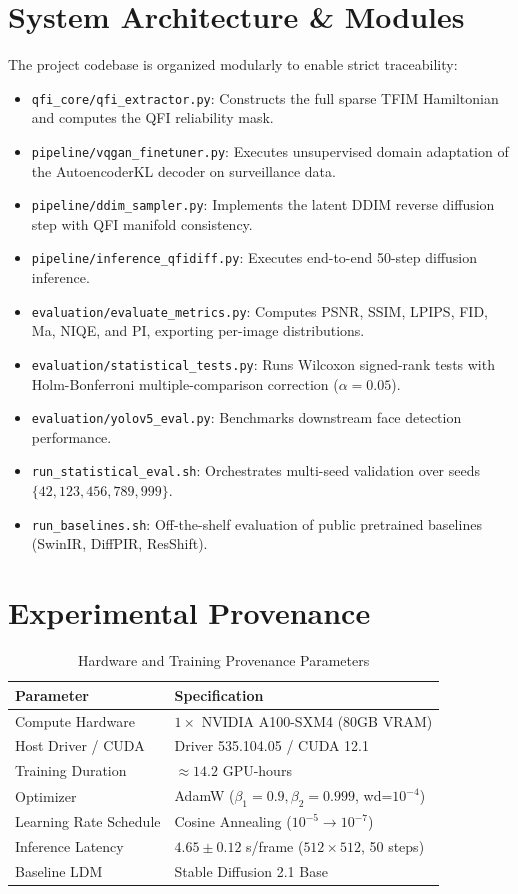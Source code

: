 \documentclass[10pt,journal,compsoc]{IEEEtran}
\begin{document}
\section{System Architecture \& Modules}
The project codebase is organized modularly to enable strict traceability:
\begin{itemize}
    \item \texttt{qfi\_core/qfi\_extractor.py}: Constructs the full sparse TFIM Hamiltonian and computes the QFI reliability mask.
    \item \texttt{pipeline/vqgan\_finetuner.py}: Executes unsupervised domain adaptation of the AutoencoderKL decoder on surveillance data.
    \item \texttt{pipeline/ddim\_sampler.py}: Implements the latent DDIM reverse diffusion step with QFI manifold consistency.
    \item \texttt{pipeline/inference\_qfidiff.py}: Executes end-to-end 50-step diffusion inference.
    \item \texttt{evaluation/evaluate\_metrics.py}: Computes PSNR, SSIM, LPIPS, FID, Ma, NIQE, and PI, exporting per-image distributions.
    \item \texttt{evaluation/statistical_tests.py}: Runs Wilcoxon signed-rank tests with Holm-Bonferroni multiple-comparison correction ($\alpha=0.05$).
    \item \texttt{evaluation/yolov5_eval.py}: Benchmarks downstream face detection performance.
    \item \texttt{run_statistical_eval.sh}: Orchestrates multi-seed validation over seeds $\{42, 123, 456, 789, 999\}$.
    \item \texttt{run_baselines.sh}: Off-the-shelf evaluation of public pretrained baselines (SwinIR, DiffPIR, ResShift).
\end{itemize}

\section{Experimental Provenance}
\begin{table}[h]
\centering
\caption{Hardware and Training Provenance Parameters}
\label{tab:provenance}
\begin{tabular}{ll}
\toprule
\textbf{Parameter} & \textbf{Specification} \\
\midrule
Compute Hardware & $1 \times$ NVIDIA A100-SXM4 (80GB VRAM) \\
Host Driver / CUDA & Driver 535.104.05 / CUDA 12.1 \\
Training Duration & $\approx 14.2$ GPU-hours \\
Optimizer & AdamW ($\beta_1=0.9, \beta_2=0.999$, wd=$10^{-4}$) \\
Learning Rate Schedule & Cosine Annealing ($10^{-5} \to 10^{-7}$) \\
Inference Latency & $4.65 \pm 0.12$ s/frame ($512\times 512$, 50 steps) \\
Baseline LDM & Stable Diffusion 2.1 Base \\
\bottomrule
\end{tabular}
\end{table}
\end{document}
